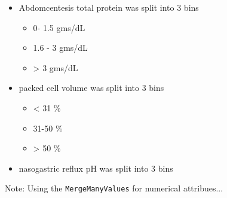 \begin{itemize}
\item Abdomcentesis total protein was split into 3 bins
\begin{itemize}
\item 0- 1.5 gms/dL
\item 1.6 - 3 gms/dL
\item > 3 gms/dL
\end{itemize}

\item packed cell volume was split into 3 bins
\begin{itemize}
\item < 31 \%
\item 31-50 \%
\item > 50 \%
\end{itemize}

\item nasogastric reflux pH was split into 3 bins


\end{itemize}

Note: Using the \verb|MergeManyValues| for numerical attribues...
